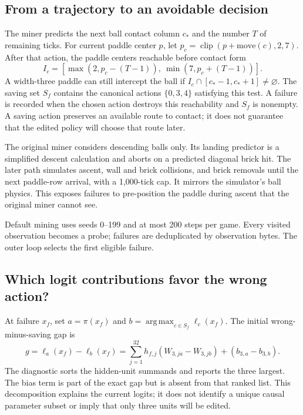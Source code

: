 \documentclass[11pt]{article}
\newcommand{\argmax}{\operatorname*{arg\,max}}
\newcommand{\code}[1]{\texttt{\detokenize{#1}}}
\begin{document}
\subsection*{From a trajectory to an avoidable decision}
The miner predicts the next ball contact column $c_*$ and the number $T$ of
remaining ticks. For current paddle center $p$, let
$p_c=\operatorname{clip}(p+\mathrm{move}(c),2,7)$.
After that action, the paddle centers reachable before contact form
\begin{equation}
 I_c=[\max(2,p_c-(T-1)),\ \min(7,p_c+(T-1))].
\end{equation}
A width-three paddle can still intercept the ball if
$I_c\cap[c_*-1,c_*+1]\ne\varnothing$.
The saving set $S_f$ contains the canonical actions $\{0,3,4\}$ satisfying this
test. A failure is recorded when the chosen action destroys this reachability
and $S_f$ is nonempty. A saving action preserves an available route to contact;
it does not guarantee that the edited policy will choose that route later.

The original miner considers descending balls only. Its landing predictor is
a simplified descent calculation and aborts on a predicted diagonal brick hit.
The later \code{use_flight=True} path simulates ascent, wall and brick collisions,
and brick removals until the next paddle-row arrival, with a 1,000-tick cap.
It mirrors the simulator's ball physics. This exposes failures to pre-position
the paddle during ascent that the original miner cannot see.

Default mining uses seeds 0--199 and at most 200 steps per game. Every visited
observation becomes a probe; failures are deduplicated by observation bytes.
The outer loop selects the first eligible failure.

\subsection*{Which logit contributions favor the wrong action?}
At failure $x_f$, set $a=\pi(x_f)$ and
$b=\argmax_{c\in S_f}\ell_c(x_f)$. The initial wrong-minus-saving gap is
\begin{equation}
 g=\ell_a(x_f)-\ell_b(x_f)
  =\sum_{j=1}^{32}h_{f,j}(W_{3,ja}-W_{3,jb})+(b_{3,a}-b_{3,b}).
 \label{eq:gap}
\end{equation}
The diagnostic sorts the hidden-unit summands and reports the three largest.
The bias term is part of the exact gap but is absent from that ranked list.
This decomposition explains the current logits; it does not identify a unique
causal parameter subset or imply that only three units will be edited.
\end{document}
